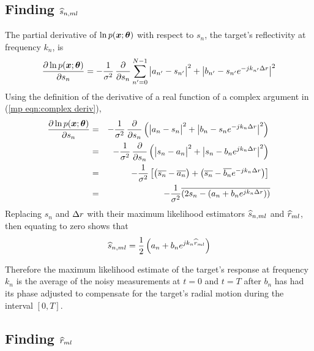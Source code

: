 \subsection{Finding $\widehat{s}_{n,ml}$}

The partial derivative of $\ln p(\bm{x};\bm{\theta})$ with respect to $s_n$, the
target's reflectivity at frequency $k_n$, is 
\begin{equation}
\frac{\del\ln p(\md;\uvp)}{\del s_n}=
-\frac{1}{\nv}\,\frac{\del}{\del s_n}\sum_{n'=0}^{N-1}
\left|\vphantom{\e{k}}a_{n'}-s_{n'}\right|^2
+\left|b_{n'}-s_{n'}\e{-jk_{n'}\dr}\right|^2
\end{equation}
Using the definition of the derivative of a real function of a complex
argument in (\ref{mp eqn:complex deriv}), 
\begin{eqnarray}
\frac{\del\ln p(\md;\uvp)}{\del s_n}
&=&-\frac{1}{\nv}\,\frac{\del}{\del s_n}\left(
\left|\vphantom{\e{k}}a_n-s_n\right|^2+\left|b_n-s_n\e{-jk_n\dr}\right|^2
\right)\nn\\
&=&-\frac{1}{\nv}\,\frac{\del}{\del s_n}\left(
\left|\vphantom{\e{k}}s_n-a_n\right|^2+\left|s_n-b_n\e{jk_n\dr}\right|^2
\right)\nn\\
&=&-\frac{1}{\nv}\left[
\left(\vphantom{\e{k}}\conj{s_n}-\conj{a_n}\right)
+\left(\conj{s_n}-\conj{b_n}\e{-jk_n\dr}\right)\right]\nn\\
&=&-\frac{1}{\nv}\conj{\left(
2s_n-\left(a_n+b_n\e{jk_n\dr}\right)\right)}
\end{eqnarray}
Replacing $s_n$ and ${\Delta r}$ with their maximum likelihood estimators 
$\widehat{s}_{n,ml}$ and $\widehat{r}_{ml}$, then equating to zero shows that
\begin{equation}\label{ml eqn:sML}
\widehat{s}_{n,ml}=\frac{1}{2}\left(a_n+b_n{e^{jk_n\widehat{r}_{ml}}}\right)
\end{equation}

Therefore the maximum likelihood estimate of the target's response at
frequency $k_n$ is the average of the noisy measurements at $t=0$ and $t=T$
after $b_n$ has had its phase adjusted to compensate for the target's radial
motion during the interval $[0,T]$.

\subsection{Finding $\widehat{r}_{ml}$}


